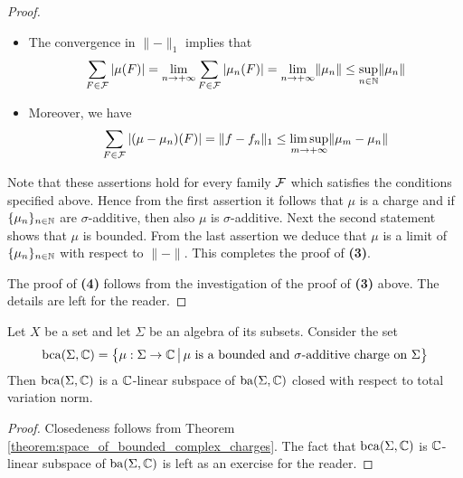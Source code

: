 \begin{proof}
\begin{itemize}
        \item The convergence in $\lVert-\rVert_1$ implies that
              $$\sum_{F \in {\mathcal F}}|\mu(F)| = \lim_{n\rightarrow +\infty}\sum_{F\in {\mathcal F}}|\mu_n(F)| = \lim_{n\rightarrow +\infty}\lVert \mu_n\rVert \leq \sup_{n\in {\mathbb N}}\lVert \mu_n\rVert$$
        \item Moreover, we have
              $$\sum_{F\in {\mathcal F}}|(\mu - \mu_n)(F)| = \lVert f - f_n\rVert_1 \leq \limsup_{m\rightarrow +\infty}\lVert \mu_m - \mu_n\rVert$$
    \end{itemize}
    Note that these assertions hold for every family ${\mathcal F}$ which satisfies the conditions specified above. Hence from the first assertion it follows that $\mu$ is a charge and if $\{\mu_n\}_{n\in {\mathbb N}}$ are $\sigma$-additive, then also $\mu$ is $\sigma$-additive. Next the second statement shows that $\mu$ is bounded. From the last assertion we deduce that $\mu$ is a limit of $\{\mu_n\}_{n\in {\mathbb N}}$ with respect to $\lVert-\rVert$. This completes the proof of \textbf{(3)}.

    The proof of \textbf{(4)} follows from the investigation of the proof of \textbf{(3)} above. The details are left for the reader.
\end{proof}

\begin{corollary}\label{corollary:spaces_of_sigma_additive_charges}
    Let $X$ be a set and let $\Sigma$ be an algebra of its subsets. Consider the set
    $$\mathrm{bca}(\Sigma, {\mathbb C}) = \big\{\mu:\Sigma \rightarrow {\mathbb C}\,\big|\,\mu\mbox{ is a bounded and $\sigma$-additive charge on }\Sigma\big\}$$
    Then $\mathrm{bca}(\Sigma,{\mathbb C})$ is a ${\mathbb C}$-linear subspace of $\mathrm{ba}(\Sigma,{\mathbb C})$ closed with respect to total variation norm.
\end{corollary}
\begin{proof}
    Closedeness follows from Theorem \ref{theorem:space_of_bounded_complex_charges}. The fact that $\mathrm{bca}(\Sigma, {\mathbb C})$ is ${\mathbb C}$-linear subspace of $\mathrm{ba}(\Sigma,{\mathbb C})$ is left as an exercise for the reader.
\end{proof}

